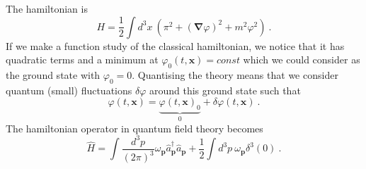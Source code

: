     The hamiltonian is 
    \begin{equation*}
        H = \frac{1}{2} \int d^3 x ~ (\pi^2 + (\boldsymbol \nabla \varphi)^2 + m^2 \varphi^2) ~.
    \end{equation*}
    If we make a function study of the classical hamiltonian, we notice that it has quadratic terms and a minimum at $\varphi_0 (t, \mathbf x) = const$ which we could consider as the ground state with $\varphi_0 = 0$. Quantising the theory means that we consider quantum (small) fluctuations $\delta \varphi$ around this ground state such that 
    \begin{equation*}
        \varphi(t, \mathbf x) = \underbrace{\varphi(t, \mathbf x)_0}_0 + \delta \varphi(t, \mathbf x) ~.
    \end{equation*} 
    The hamiltonian operator in quantum field theory becomes
    \begin{equation}\label{hamkg}
        \hat H = \int \frac{d^3 p}{(2\pi)^3} \omega_{\mathbf p} \hat a_{\mathbf p}^\dagger \hat a_{\mathbf p} + \frac{1}{2} \int d^3 p ~ \omega_{\mathbf p} \delta^3 (0) ~.
    \end{equation}

